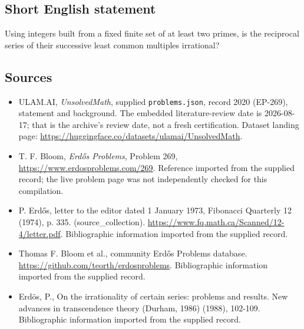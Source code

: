 \documentclass[11pt,a4paper]{article}
\begin{document}
\subsection{Short English statement}

Using integers built from a fixed finite set of at least two primes, is the reciprocal series of their successive least common multiples irrational?

\subsection{Sources}

{\small

\begin{itemize}

\item[\hypertarget{source:2020:1}{S1}] ULAM.AI, \emph{UnsolvedMath}, supplied \texttt{problems.json}, record 2020 (EP-269), statement and background. The embedded literature-review date is 2026-08-17; that is the archive’s review date, not a fresh certification. Dataset landing page: \url{https://huggingface.co/datasets/ulamai/UnsolvedMath}.

\item[\hypertarget{source:2020:2}{S2}] T. F. Bloom, \emph{Erdős Problems}, Problem 269, \url{https://www.erdosproblems.com/269}. Reference imported from the supplied record; the live problem page was not independently checked for this compilation.

\item[\hypertarget{source:2020:3}{S3}] P. Erdős, letter to the editor dated 1 January 1973, Fibonacci Quarterly 12 (1974), p. 335. (source\_collection). \url{https://www.fq.math.ca/Scanned/12-4/letter.pdf}. Bibliographic information imported from the supplied record.

\item[\hypertarget{source:2020:4}{S4}] Thomas F. Bloom et al., community Erdős Problems database. \url{https://github.com/teorth/erdosproblems}. Bibliographic information imported from the supplied record.

\item[\hypertarget{source:2020:5}{S5}] Erd\"{o}s, P., On the irrationality of certain series: problems and results. New advances in transcendence theory (Durham, 1986) (1988), 102-109. Bibliographic information imported from the supplied record.

\end{itemize}

}

\label{end:2020}
\end{document}

